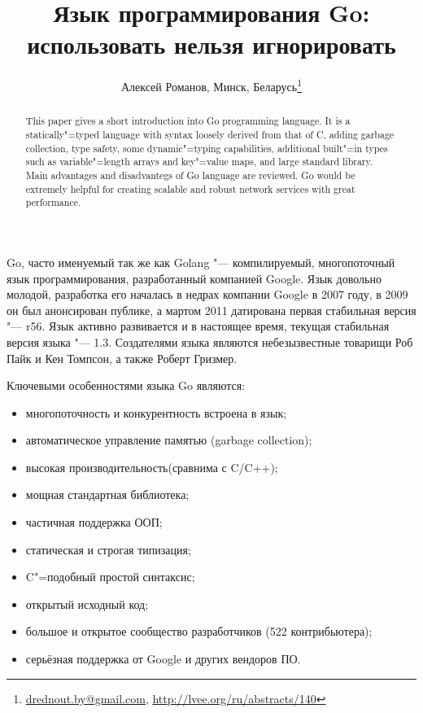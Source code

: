 \documentclass[10pt, a5paper]{article}
\begin{document}
\title{Язык программирования Go: использовать нельзя игнорировать}
\author{Алексей Романов, Минск, Беларусь\footnote{\url{drednout.by@gmail.com}, \url{http://lvee.org/ru/abstracts/140}}}
\maketitle
\begin{abstract}
This paper gives a short introduction into Go programming language. 
It is a statically"=typed language with syntax loosely derived from that of C, adding garbage collection, type safety, some dynamic"=typing capabilities, additional built"=in types such as variable"=length arrays and key"=value maps, and large standard library.
Main advantages and disadvantegs of Go language are reviewed. Go would be extremely helpful for creating scalable and robust network services with great performance. 
\end{abstract}
Go, часто именуемый так же как Golang "--- компилируемый, многопоточный язык программирования, разработанный компанией \linebreak Google. Язык довольно молодой, разработка его началась в недрах компании Google в 2007 году, в 2009 он был анонсирован публике, а мартом 2011 датирована первая стабильная версия "--- r56. Язык активно развивается и в настоящее время, текущая стабильная версия языка "--- 1.3. Создателями языка являются небезызвестные товарищи Роб Пайк и Кен Томпсон, а также Роберт Гризмер.

Ключевыми особенностями языка Go являются:

\begin{itemize}
  \item многопоточность и конкурентность встроена в язык;
  \item автоматическое управление памятью (garbage collection);
  \item высокая производительность(сравнима с C/C++);
  \item мощная стандартная библиотека;
  \item частичная поддержка ООП;
  \item статическая и строгая типизация;
  \item C"=подобный простой синтаксис;
  \item открытый исходный код;
  \item большое и открытое сообщество разработчиков (522 контрибьютера);
  \item серьёзная поддержка от Google и других вендоров ПО.
\end{itemize}
\end{document}
